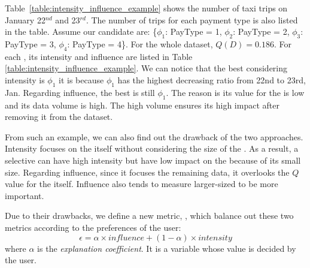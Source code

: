 Table~\ref{table:intensity_influence_example} shows the number of taxi trips on January 22$^{nd}$ and 23$^{rd}$. The number of trips for each payment type is also listed in the table. Assume our candidate {\explanation} are: \{$\phi_1$: PayType = 1, $\phi_2$: PayType = 2, $\phi_3$: PayType = 3, $\phi_4$: PayType = 4\}.
For the whole dataset, $Q(D) = 0.186$. 
For each {\explanation}, its intensity and influence are listed in Table \ref{table:intensity_influence_example}. We can notice that the best {\explanation} considering intensity is $\phi_1$ it is because $\phi_1$ has the highest decreasing ratio from 22nd to 23rd, Jan. Regarding influence, the best {\explanation} is still $\phi_1$. The reason is its value for the {\fact} is low and its data volume is high. The high volume ensures its high impact after removing it from the dataset.

From such an example, we can also find out the drawback of the two approaches. Intensity focuses on the {\explanation} itself without considering the size of the {\explanation}. As a result, a selective {\explanation} can have high intensity but have low impact on the {\fact} because of its small size. Regarding influence, since it focuses the remaining data, it overlooks the $Q$ value for the {\explanation} itself. Influence also tends to measure larger-sized {\explanation} to be more important. 

Due to their drawbacks, we define a new metric, {\newvalue}, which balance out these two metrics according to the preferences of the user: 
$$\epsilon = \alpha \times influence + (1-\alpha) \times intensity$$
where $\alpha$ is the \textit{explanation coefficient}. It is a variable whose value is decided by the user.

